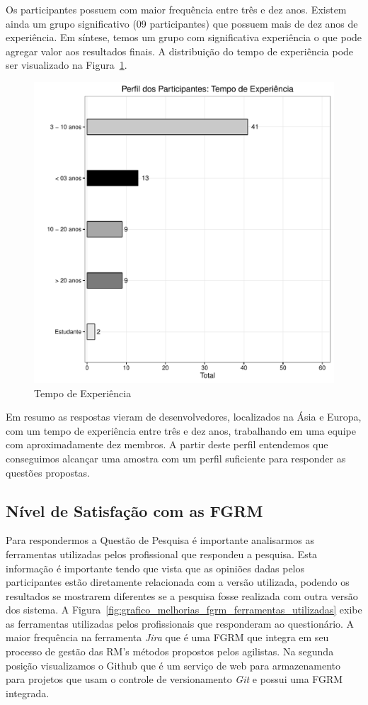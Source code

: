Os participantes possuem com maior frequência entre três e dez anos. Existem
ainda um grupo significativo (09 participantes) que possuem mais de dez anos de
experiência. Em síntese, temos um grupo com significativa experiência o que pode
agregar valor aos resultados finais. A distribuição do tempo de experiência pode
ser visualizado na Figura~\ref{fig:grafico_melhorias_fgrm_tempo_experiencia}.

\begin{figure}[htpb]
	\centering
	\includegraphics[width=0.8\linewidth]{./chapter-pesquisa-com-profissionais/img/grafico_melhorias_fgrm_tempo_experiencia.pdf}
	\caption{Tempo de Experiência}
\label{fig:grafico_melhorias_fgrm_tempo_experiencia}
\end{figure}

Em resumo as respostas vieram de desenvolvedores, localizados na Ásia e Europa,
com um tempo de experiência entre três e dez anos, trabalhando em uma equipe com
aproximadamente dez membros. A partir deste perfil entendemos que conseguimos
alcançar uma amostra com um perfil suficiente para responder as questões
propostas.

\subsection{Nível de Satisfação com as FGRM}
\label{sub:nivel_de_satisfação_com_as_fgrm}

Para respondermos a Questão de Pesquisa é importante analisarmos as ferramentas
utilizadas pelos profissional que respondeu a pesquisa. Esta informação é
importante tendo que vista que as opiniões dadas pelos participantes estão
diretamente relacionada com a versão utilizada, podendo os resultados se
mostrarem diferentes se a pesquisa fosse realizada com outra versão dos sistema.
A Figura~\ref{fig:grafico_melhorias_fgrm_ferramentas_utilizadas} exibe as
ferramentas utilizadas pelos profissionais que responderam ao questionário. A
maior frequência na ferramenta \textit{Jira} que é uma FGRM que integra em seu
processo de gestão das RM's métodos propostos pelos agilistas. Na segunda
posição visualizamos o Github que é um serviço de web para armazenamento para
projetos que usam o controle de versionamento \textit{Git} e possui uma FGRM
integrada.

